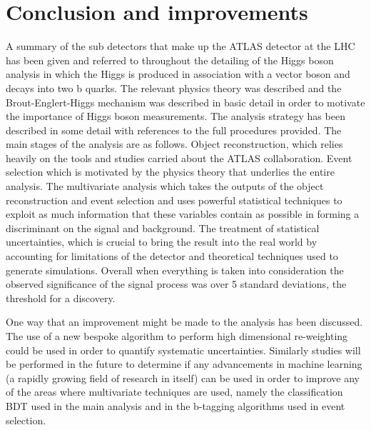 \chapter{Conclusion and improvements}%
\label{sec:conclusion}

A summary of the sub detectors that make up the ATLAS detector at the LHC has been given and referred
to throughout the detailing of the Higgs boson analysis in which the Higgs is produced in association
with a vector boson and decays into two b quarks. The relevant physics theory was described and the
Brout-Englert-Higgs mechanism was described in basic detail in order to motivate the importance of
Higgs boson measurements. The analysis strategy has been described in some detail with references to
the full procedures provided. The main stages of the analysis are as follows. Object reconstruction,
which relies heavily on the tools and studies carried about the ATLAS collaboration. Event selection
which is motivated by the physics theory that underlies the entire analysis. The multivariate analysis
which takes the outputs of the object reconstruction and event selection and uses powerful statistical
techniques to exploit as much information that these variables contain as possible in forming a
discriminant on the signal and background. The treatment of statistical uncertainties, which is crucial
to bring the result into the real world by accounting for limitations of the detector and theoretical
techniques used to generate simulations. Overall when everything is taken into consideration the
observed significance of the signal process was over 5 standard deviations, the threshold for a
discovery.

One way that an improvement might be made to the analysis has been discussed. The use of a new bespoke
algorithm to perform high dimensional re-weighting could be used in order to quantify systematic
uncertainties. Similarly studies will be performed in the future to determine if any advancements in
machine learning (a rapidly growing field of research in itself) can be used in order to improve any of
the areas where multivariate techniques are used, namely the classification BDT used in the main
analysis and in the b-tagging algorithms used in event selection.

